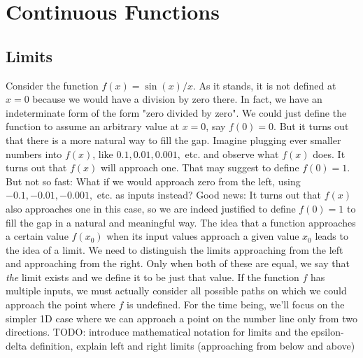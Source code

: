 \section{Continuous Functions}

\subsection{Limits}
Consider the function $f(x) = \sin (x) / x$. As it stands, it is not defined at $x = 0$ because we would have a division by zero there. In fact, we have an indeterminate form of the form "zero divided by zero". We could just define the function to assume an arbitrary value at $x = 0$, say $f(0) = 0$. But it turns out that there is a more natural way to fill the gap. Imagine plugging ever smaller numbers into $f(x)$, like $0.1, 0.01, 0.001, $ etc. and observe what $f(x)$ does. It turns out that $f(x)$ will approach one. That may suggest to define $f(0) = 1$. But not so fast: What if we would approach zero from the left, using $-0.1, -0.01, -0.001,$ etc. as inputs instead? Good news: It turns out that $f(x)$ also approaches one in this case, so we are indeed justified to define $f(0)=1$ to fill the gap in a natural and meaningful way. The idea that a function approaches a certain value $f(x_0)$ when its input values approach a given value $x_0$ leads to the idea of a limit. We need to distinguish the limits approaching from the left and approaching from the right. Only when both of these are equal, we say that \emph{the} limit exists and we define it to be just that value. If the function $f$ has multiple inputs, we must actually consider all possible paths on which we could approach the point where $f$ is undefined. For the time being, we'll focus on the simpler 1D case where we can approach a point on the number line only from two directions.
TODO: introduce mathematical notation for limits and the epsilon-delta definition, explain left and right limits (approaching from below and above)






